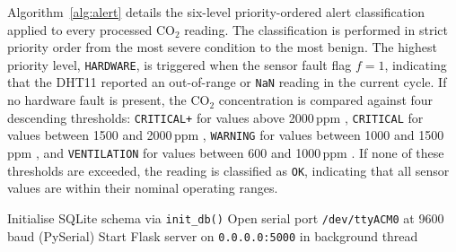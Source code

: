 Algorithm~\ref{alg:alert} details the six-level priority-ordered alert classification applied to every processed CO$_2$ reading. The classification is performed in strict priority order from the most severe condition to the most benign. The highest priority level, \texttt{HARDWARE}, is triggered when the sensor fault flag $f = 1$, indicating that the DHT11 reported an out-of-range or \texttt{NaN} reading in the current cycle. If no hardware fault is present, the CO$_2$ concentration is compared against four descending thresholds: \texttt{CRITICAL+} for values above 2000\,ppm \cite{r47,r48}, \texttt{CRITICAL} for values between 1500 and 2000\,ppm \cite{r47}, \texttt{WARNING} for values between 1000 and 1500\,ppm \cite{r48,r49}, and \texttt{VENTILATION} for values between 600 and 1000\,ppm \cite{r46}. If none of these thresholds are exceeded, the reading is classified as \texttt{OK}, indicating that all sensor values are within their nominal operating ranges.

\begin{algorithm}[H]
\DontPrintSemicolon
\caption{Environmental Monitoring Acquisition and Dispatch Pipeline}
\label{alg:envpipeline}
\BlankLine
Initialise SQLite schema via \texttt{init\_db()}\;
Open serial port \texttt{/dev/ttyACM0} at 9600\,baud (PySerial)\;
Start Flask server on \texttt{0.0.0.0:5000} in background thread\;
\BlankLine
{}
\end{algorithm}

